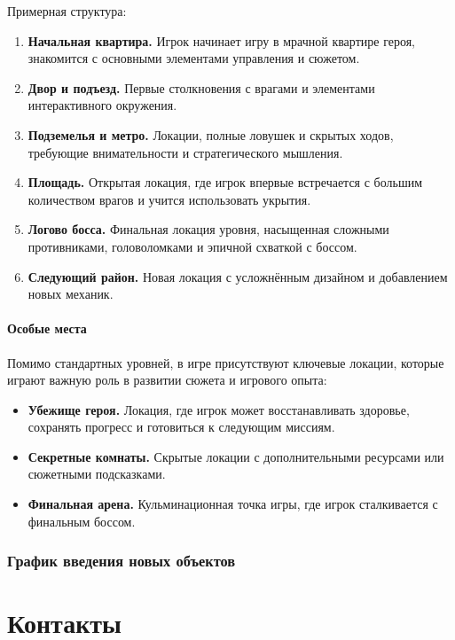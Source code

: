 \documentclass[12pt]{article}
\begin{document}
        Примерная структура:  
        \begin{enumerate}
            \item \textbf{Начальная квартира.} Игрок начинает игру в мрачной квартире героя, знакомится с основными элементами управления и сюжетом.  
            \item \textbf{Двор и подъезд.} Первые столкновения с врагами и элементами интерактивного окружения.  
            \item \textbf{Подземелья и метро.} Локации, полные ловушек и скрытых ходов, требующие внимательности и стратегического мышления.  
            \item \textbf{Площадь.} Открытая локация, где игрок впервые встречается с большим количеством врагов и учится использовать укрытия.  
            \item \textbf{Логово босса.} Финальная локация уровня, насыщенная сложными противниками, головоломками и эпичной схваткой с боссом.  
            \item \textbf{Следующий район.} Новая локация с усложнённым дизайном и добавлением новых механик.  
        \end{enumerate}
        
        \paragraph{Особые места}  
        Помимо стандартных уровней, в игре присутствуют ключевые локации, которые играют важную роль в развитии сюжета и игрового опыта:  
        \begin{itemize}
            \item \textbf{Убежище героя.} Локация, где игрок может восстанавливать здоровье, сохранять прогресс и готовиться к следующим миссиям.  
            \item \textbf{Секретные комнаты.} Скрытые локации с дополнительными ресурсами или сюжетными подсказками.  
            \item \textbf{Финальная арена.} Кульминационная точка игры, где игрок сталкивается с финальным боссом.  
        \end{itemize}
        
        \subsubsection{График введения новых объектов}
    
\section{Контакты}

\newpage
\end{document}
